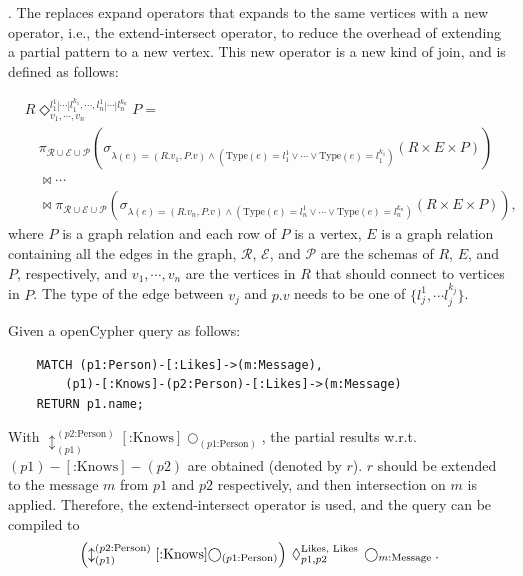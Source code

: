\expandintersectrule.
The \expandintersectrule replaces expand operators that expands to the same vertices with a new operator, i.e., the extend-intersect operator, to reduce the overhead of extending a partial pattern to a new vertex.
This new operator is a new kind of join, and is defined as follows:

\begin{equation}
    \begin{split}
        & R \Diamond^{l_1^{1}|\cdots|l_1^{k_1}, \cdots, l_n^{1}|\cdots|l_n^{k_n}}_{v_1, \cdots, v_n} P = \\ 
        & \hspace{1em} \pi_{\mathcal{R} \cup \mathcal{E} \cup \mathcal{P}}(\sigma_{\lambda(e) = (R.v_1, P.v) \land (\text{Type}(e) = l_1^1 \lor \cdots \lor \text{Type}(e) = l_1^{k_1})}(R \times E \times P)) \\
        & \hspace{1em} \Join \cdots \\
        & \hspace{1em} \Join \pi_{\mathcal{R} \cup \mathcal{E} \cup \mathcal{P}}(\sigma_{\lambda(e) = (R.v_n, P.v) \land (\text{Type}(e) = l_n^1 \lor \cdots \lor \text{Type}(e) = l_n^{k_n})}(R \times E \times P)),
    \end{split}
\end{equation}
where $P$ is a graph relation and each row of $P$ is a vertex,
$E$ is a graph relation containing all the edges in the graph, 
$\mathcal{R}$, $\mathcal{E}$, and $\mathcal{P}$ are the schemas of $R$, $E$, and $P$, respectively,
and $v_1, \cdots, v_n$ are the vertices in $R$ that should connect to vertices in $P$.
The type of the edge between $v_j$ and $p.v$ needs to be one of $\{l_j^1, \cdots l_j^{k_j}\}$.

Given a openCypher query as follows:
\begin{lstlisting}
    MATCH (p1:Person)-[:Likes]->(m:Message),
        (p1)-[:Knows]-(p2:Person)-[:Likes]->(m:Message)
    RETURN p1.name;
\end{lstlisting}
With $\updownarrow^{(p2\text{:Person})}_{(p1)}[\text{:Knows}]\bigcirc_{(p1\text{:Person})}$, the partial results w.r.t.~$(p1)-[\text{:Knows}]-(p2)$ are obtained (denoted by $r$). 
$r$ should be extended to the message $m$ from $p1$ and $p2$ respectively, and then intersection on $m$ is applied.
Therefore, the extend-intersect operator is used, and the query can be compiled to
\begin{equation}
    \left(\updownarrow^{(p2\text{:Person})}_{(p1)}[\text{:Knows}]\bigcirc_{(p1\text{:Person})}\right) \hspace{0.2em} \Diamond_{p1, p2}^{\text{Likes, Likes}} \hspace{0.2em} \bigcirc_{m\text{:Message}}.
\end{equation}

